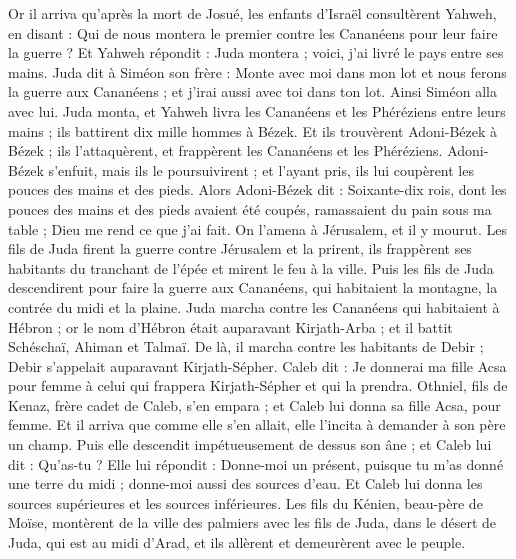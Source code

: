 \begin{multicols}{2}
\VerseOne{}Or il arriva qu'après la mort de Josué, les enfants d'Israël consultèrent Yahweh, en disant : Qui de nous montera le premier contre les Cananéens pour leur faire la guerre ?
Et Yahweh répondit : Juda montera ; voici, j'ai livré le pays entre ses mains.
Juda dit à Siméon son frère : Monte avec moi dans mon lot et nous ferons la guerre aux Cananéens ; et j'irai aussi avec toi dans ton lot. Ainsi Siméon alla avec lui.
Juda monta, et Yahweh livra les Cananéens et les Phéréziens entre leurs mains ; ils battirent dix mille hommes à Bézek.
Et ils trouvèrent Adoni-Bézek à Bézek ; ils l'attaquèrent, et frappèrent les Cananéens et les Phéréziens.
Adoni-Bézek s'enfuit, mais ils le poursuivirent ; et l'ayant pris, ils lui coupèrent les pouces des mains et des pieds.
Alors Adoni-Bézek dit : Soixante-dix rois, dont les pouces des mains et des pieds avaient été coupés, ramassaient du pain sous ma table ; Dieu me rend ce que j’ai fait. On l’amena à Jérusalem, et il y mourut.
Les fils de Juda firent la guerre contre Jérusalem et la prirent, ils frappèrent ses habitants du tranchant de l'épée et mirent le feu à la ville.
Puis les fils de Juda descendirent pour faire la guerre aux Cananéens, qui habitaient la montagne, la contrée du midi et la plaine.
Juda marcha contre les Cananéens qui habitaient à Hébron ; or le nom d'Hébron était auparavant Kirjath-Arba ; et il battit Schéschaï, Ahiman et Talmaï.
De là, il marcha contre les habitants de Debir ; Debir s’appelait auparavant Kirjath-Sépher.
Caleb dit : Je donnerai ma fille Acsa pour femme à celui qui frappera Kirjath-Sépher et qui la prendra.
Othniel, fils de Kenaz, frère cadet de Caleb, s’en empara ; et Caleb lui donna sa fille Acsa, pour femme.
Et il arriva que comme elle s'en allait, elle l'incita à demander à son père un champ. Puis elle descendit  impétueusement de dessus son âne ; et Caleb lui dit : Qu'as-tu ?
Elle lui répondit : Donne-moi un présent, puisque tu m'as donné une terre du midi ; donne-moi aussi des sources d'eau. Et Caleb lui donna les sources supérieures et les sources inférieures.
Les fils du Kénien, beau-père de Moïse, montèrent de la ville des palmiers avec les fils de Juda, dans le désert de Juda, qui est au midi d'Arad, et ils allèrent et demeurèrent avec le peuple.

\end{multicols}
